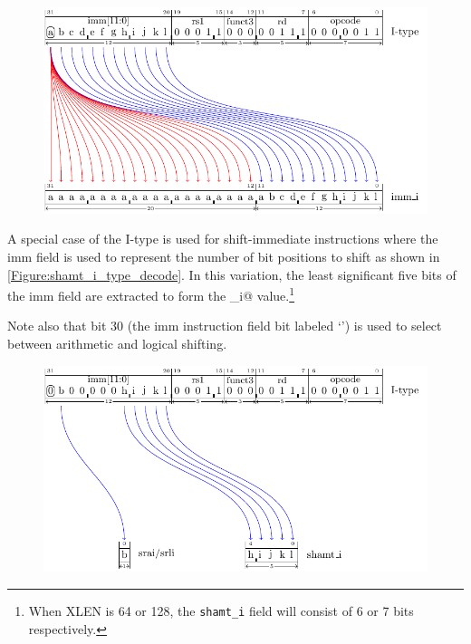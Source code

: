 \begin{figure}[ht]
  \centering
  \includegraphics{figures/chapter05/ITypeDecode.pdf}
  \label{Figure:i_type_decode}
  \label{imm.i:decode}
\end{figure}

A special case of the I-type is used for shift-immediate instructions
where the imm field is used to represent the number of bit positions
to shift as shown in \autoref{Figure:shamt_i_type_decode}.
In this variation, the least significant five bits of the imm field are
extracted to form the \verb@shamt_i@
value.\footnote{When XLEN is 64 or 128, the \texttt{shamt\_i} field will
consist of 6 or 7 bits respectively.}

Note also that bit 30 (the imm instruction field bit labeled `\verb@b@') is used to select
between arithmetic and logical shifting.

\begin{figure}[ht]
  \centering
  \includegraphics{figures/chapter05/ITypeShiftDecode.pdf}
  \label{Figure:shamt_i_type_decode}
  \label{shamt.i:decode}
\end{figure}



